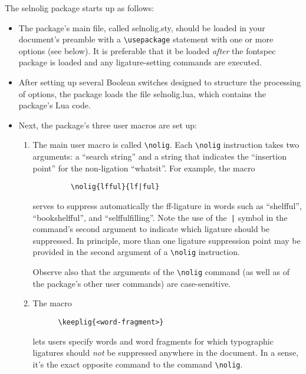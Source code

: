 \documentclass[12pt]{article}
\newcommand{\pkg}[1]{\textsf{#1}}
\newcommand{\cmmd}[1]{\texttt{\textbackslash #1}}
\begin{document}
The \pkg{selnolig} package starts up as follows:
\begin{itemize}
\item The package's main file, called \pkg{selnolig.sty}, should be loaded in your document's preamble with a \cmmd{usepackage} statement with one or more options (see below). It is preferable that it be loaded \emph{after} the \pkg{fontspec} package is loaded and any ligature-setting commands are executed.
\item After setting up several Boolean switches designed to structure the processing of options, the package loads the file \pkg{selnolig.lua}, which contains the package's Lua code.
\item Next, the package's three user macros are set up:
\begin{enumerate}
\item The main user macro is called \cmmd{nolig}. Each \cmmd{nolig} instruction takes two arguments: a \enquote{search string} and a string that indicates the \enquote{insertion point} for the non-ligation \enquote{whatsit}. For example, the macro
    \begin{Verbatim}
         \nolig{lfful}{lf|ful}
    \end{Verbatim}
serves to suppress automatically the ff-ligature in words such as \enquote{shelfful}, \enquote{bookshelfful}, and \enquote{selffulfilling}. Note the use of the~\Verb/|/ symbol in the command's second argument to indicate which ligature should be suppressed. In principle, more than one ligature suppression point may be provided in the second argument of a \cmmd{nolig} instruction.

Observe also that the arguments of the \cmmd{nolig} command (as well as of the package's other user commands) are case-sensitive. 

\item The macro 
\begin{Verbatim}
      \keeplig{<word-fragment>}
\end{Verbatim}
lets users specify words and word fragments for which typographic ligatures should \emph{not} be suppressed anywhere in the document. In a sense, it's the exact opposite command to the command \cmmd{nolig}. 


\end{enumerate}
\end{itemize}
\end{document}
